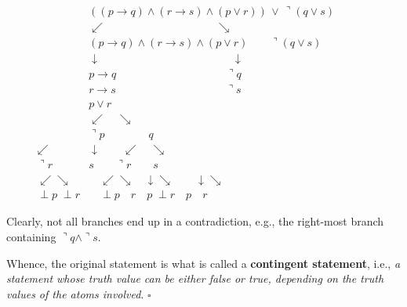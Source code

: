 \begin{itemize}
  \begin{equation}
  \begin{array}{rcl}
  \phantom{p} & \left( (p\rightarrow q) \wedge (r\rightarrow s) \wedge (p\vee r)\right) \,\vee\, \urcorner (q\vee s) & \phantom{p} 
  \\
  \phantom{p} & \swarrow \qquad\qquad \qquad\qquad\qquad\searrow &  \phantom{p}
  \\
    \phantom{p} & (p\rightarrow q) \wedge (r\rightarrow s) \wedge (p\vee r) \quad\quad   \urcorner (q\vee s) & \phantom{a}
  \\
    \phantom{p} & \downarrow \qquad\qquad\qquad\qquad\qquad\qquad   \downarrow & \phantom{a}
  \\  
    \phantom{p} & p\rightarrow q \qquad\qquad\qquad\qquad\qquad   \urcorner q  & \phantom{a}
  \\
    \phantom{p} & r\rightarrow s \qquad\qquad\qquad\qquad\qquad   \urcorner s & \phantom{a}
  \\
    \phantom{p} & p\vee r        \qquad\qquad\qquad\qquad\qquad   \phantom{q\vee s} & \phantom{a}
  \\
    \phantom{p} & \swarrow\quad\searrow \quad\qquad\qquad\qquad\qquad\qquad   \phantom{q\vee s} & \phantom{a}
  \\
    \phantom{p} & \urcorner p\qquad\qquad q        \qquad \qquad\qquad\qquad\qquad\qquad  \phantom{q\vee s} & \phantom{a}
  \\
    \swarrow  & \downarrow \qquad \swarrow\quad\searrow        \qquad\qquad \qquad\qquad\qquad   \phantom{q\vee s} & \phantom{a}
  \\
    \urcorner r \quad  & s    \qquad  \urcorner r\qquad s \qquad\qquad\qquad\qquad\qquad \phantom{q\vee s} & \phantom{a}
  \\
    \swarrow\searrow  & \quad\swarrow\searrow   \quad  \downarrow\searrow \qquad \downarrow\searrow \qquad\qquad\qquad\qquad\qquad \phantom{q\vee s} & \phantom{a}
  \\
   \perp p\; \perp r  & \quad \perp p\quad r   \quad  p\; \perp r \quad p\quad r \qquad\qquad\qquad\qquad\qquad \phantom{q\vee s} & \phantom{a}
  \end{array}
  \end{equation}

  Clearly, not all branches end up in a contradiction, e.g., the
  right-most branch containing \(\urcorner q \wedge \urcorner s\).

  Whence, the original statement is what is called a \textbf{contingent
  statement}, i.e., \emph{a statement whose truth value can be either
  false or true, depending on the truth values of the atoms involved}.
  \(\square\)
\end{itemize}
